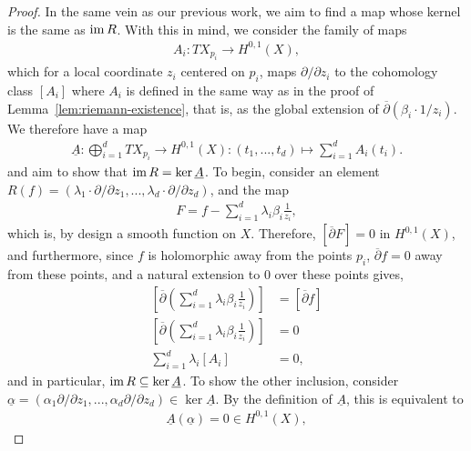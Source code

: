 \begin{theorem}
\begin{proof}
		In the same vein as our previous work, we aim to find a map whose kernel is
		the same as $ \operatorname{im} R $. With this in mind, we consider the family of maps
		\begin{align*}
			A_{i}:TX_{p_{i}} \to H^{0,1}(X),
		\end{align*}
		which for a local coordinate $ z_{i} $ centered on $ p_{i} $, maps $
			\partial/\partial z_{i} $ to the cohomology class $ [ A_{i} ] $ where $
			A_{i} $ is defined in the same way as in the proof of
		Lemma~\ref{lem:riemann-existence}, that is, as the global extension of $
			\overline{\partial}( \beta_{i} \cdot 1/z_{i} ) $. We therefore have a map
		\begin{align*}
			\underline{A}: \bigoplus_{i=1}^{d}{TX_{p_{i}}} \to H^{0,1}(X):
			( t_{1},...,t_{d} )\mapsto \sum_{i=1}^{d}{A_{i}( t_{i} )}.
		\end{align*}
		and aim to show that $ \operatorname{im} R = \ker \underline{A} $. To begin, consider
		an element $ R ( f ) = ( \lambda_{1}\cdot \partial/\partial z_{1},...,
			\lambda_{d}\cdot \partial/\partial z_{d} ) $, and the map
		\begin{align*}
			F = f - \sum_{i=1}^{d}{\lambda_{i}\beta_{i}\frac{1}{z_{i}}},
		\end{align*}
		which is, by design a smooth function on $ X $. Therefore, $ [
					\overline{\partial }F ]=0 $ in $ H^{0,1}(X) $, and furthermore, since $ f $
		is holomorphic away from the points $ p_{i} $, $ \overline{\partial }f=0 $
		away from these points, and a natural extension to $ 0 $ over these points
		gives,
		\begin{align*}
			\left[\overline{\partial }\left(
			\sum_{i=1}^{d}{\lambda_{i}\beta_{i}\frac{1}{z_{i}}} \right) \right] & =
			[\overline{\partial }f ]                                                   \\
			\left[\overline{\partial }\left(
			\sum_{i=1}^{d}{\lambda_{i}\beta_{i}\frac{1}{z_{i}}} \right) \right] & = 0  \\
			\sum_{i=1}^{d}{\lambda_{i}[ A_{i} ]}                                & = 0,
		\end{align*}
		and in particular, $ \operatorname{im} R \subseteq \ker \underline{A} $. To show the other
		inclusion, consider $ \underline{\alpha} = ( \alpha_{1}\partial/\partial
			z_{1},..., \alpha_{d}\partial/\partial z_{d} )\in \ker \underline{A} $. By
		the definition of $ \underline{A} $, this is equivalent to
		\begin{align*}
			\underline{A}( \underline{\alpha} ) = 0 \in H^{0,1}(X),
		\end{align*}

\end{proof}
\end{theorem}
